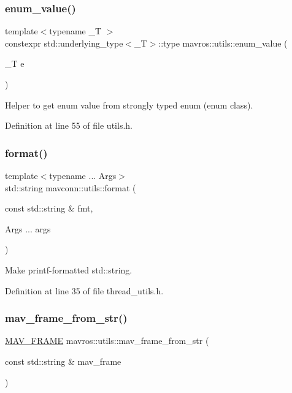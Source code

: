 \subsubsection{\texorpdfstring{enum\_value()}{enum\_value()}}
{\footnotesize\ttfamily template$<$typename \+\_\+T $>$ \\
constexpr std\+::underlying\+\_\+type$<$\+\_\+T$>$\+::type mavros\+::utils\+::enum\+\_\+value (\begin{DoxyParamCaption}\item[{\+\_\+T}]{e }\end{DoxyParamCaption})\hspace{0.3cm}{\ttfamily [constexpr]}}

Helper to get enum value from strongly typed enum (enum class). 

Definition at line 55 of file utils.\+h.

\mbox{\label{group__mavutils_ga0d03da68919138512c198995276dd9ea}} 
\subsubsection{\texorpdfstring{format()}{format()}}
{\footnotesize\ttfamily template$<$typename ... Args$>$ \\
std\+::string mavconn\+::utils\+::format (\begin{DoxyParamCaption}\item[{const std\+::string \&}]{fmt,  }\item[{Args ...}]{args }\end{DoxyParamCaption})}



Make printf-\/formatted std\+::string. 



Definition at line 35 of file thread\+\_\+utils.\+h.

\mbox{\label{group__mavutils_gaeecc00ce9cf4ea787c7309235e35cf8d}} 
\subsubsection{\texorpdfstring{mav\_frame\_from\_str()}{mav\_frame\_from\_str()}}
{\footnotesize\ttfamily \mbox{\hyperlink{include__v0_89_2mavlink__types_8h_aae9266d97d838a375605b69000c60617}{M\+A\+V\+\_\+\+F\+R\+A\+ME}} mavros\+::utils\+::mav\+\_\+frame\+\_\+from\+\_\+str (\begin{DoxyParamCaption}\item[{const std\+::string \&}]{mav\+\_\+frame }\end{DoxyParamCaption})}



